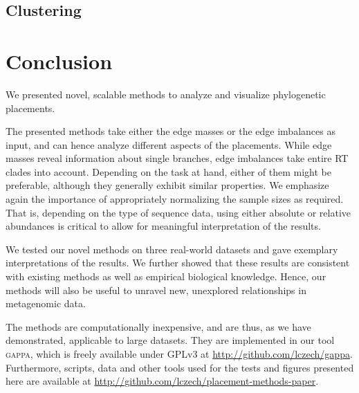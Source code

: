 \documentclass[10pt,letterpaper]{article}
\newcommand\toolname{\textsc}
\begin{document}
\subsection*{Clustering}
\label{sec:Results:sub:Clustering}



%


\section*{Conclusion}
\label{sec:Conclusion}

We presented novel, scalable methods to analyze and visualize phylogenetic placements.

The presented methods take either the edge masses or the edge imbalances as input,
and can hence analyze different aspects of the placements.
While edge masses reveal information about single branches,
edge imbalances take entire \acl{RT} clades into account.
Depending on the task at hand, either of them might be preferable,
although they generally exhibit similar properties.
We emphasize again the importance of appropriately normalizing the sample sizes as required.
That is, depending on the type of sequence data,
using either absolute or relative abundances is critical to allow for meaningful interpretation of the results.

We tested our novel methods on three real-world datasets and gave exemplary interpretations of the results.
We further showed that these results are consistent with existing methods as well as empirical biological knowledge.
Hence, our methods will also be useful to unravel new, unexplored relationships in metagenomic data.

The methods are computationally inexpensive, and are thus, as we have demonstrated, applicable to large datasets.
They are implemented in our tool \toolname{gappa},
which is freely available under GPLv3 at \url{http://github.com/lczech/gappa}.
Furthermore, scripts, data and other tools used for the tests and figures presented here
are available at \url{http://github.com/lczech/placement-methods-paper}.
\end{document}
